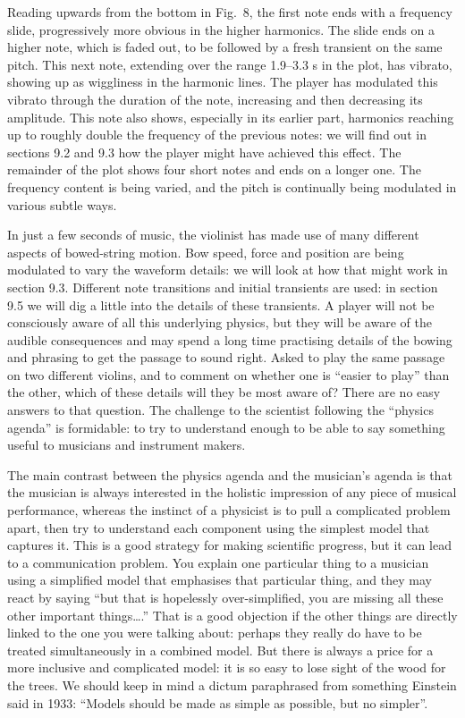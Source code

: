   Reading upwards from the bottom in Fig.\ 8, the first note ends with a 
  frequency slide, progressively more obvious in the higher harmonics. The 
  slide ends on a higher note, which is faded out, to be followed by a fresh 
  transient on the same pitch. This next note, extending over the range 
  1.9--3.3 s in the plot, has vibrato, showing up as wiggliness in the harmonic 
  lines. The player has modulated this vibrato through the duration of the 
  note, increasing and then decreasing its amplitude. This note also shows, 
  especially in its earlier part, harmonics reaching up to roughly double the 
  frequency of the previous notes: we will find out in sections 9.2 and 9.3 how 
  the player might have achieved this effect. The remainder of the plot shows 
  four short notes and ends on a longer one. The frequency content is being 
  varied, and the pitch is continually being modulated in various subtle ways. 

  In just a few seconds of music, the violinist has made use of many different 
  aspects of bowed-string motion. Bow speed, force and position are being 
  modulated to vary the waveform details: we will look at how that might work 
  in section 9.3. Different note transitions and initial transients are used: 
  in section 9.5 we will dig a little into the details of these transients. A 
  player will not be consciously aware of all this underlying physics, but they 
  will be aware of the audible consequences and may spend a long time 
  practising details of the bowing and phrasing to get the passage to sound 
  right. Asked to play the same passage on two different violins, and to 
  comment on whether one is “easier to play” than the other, which of these 
  details will they be most aware of? There are no easy answers to that 
  question. The challenge to the scientist following the “physics agenda” is 
  formidable: to try to understand enough to be able to say something useful to 
  musicians and instrument makers. 

  The main contrast between the physics agenda and the musician’s agenda is 
  that the musician is always interested in the holistic impression of any 
  piece of musical performance, whereas the instinct of a physicist is to pull 
  a complicated problem apart, then try to understand each component using the 
  simplest model that captures it. This is a good strategy for making 
  scientific progress, but it can lead to a communication problem. You explain 
  one particular thing to a musician using a simplified model that emphasises 
  that particular thing, and they may react by saying “but that is hopelessly 
  over-simplified, you are missing all these other important things….” That is 
  a good objection if the other things are directly linked to the one you were 
  talking about: perhaps they really do have to be treated simultaneously in a 
  combined model. But there is always a price for a more inclusive and 
  complicated model: it is so easy to lose sight of the wood for the trees. We 
  should keep in mind a dictum paraphrased from something Einstein said in 
  1933: “Models should be made as simple as possible, but no simpler”. 

